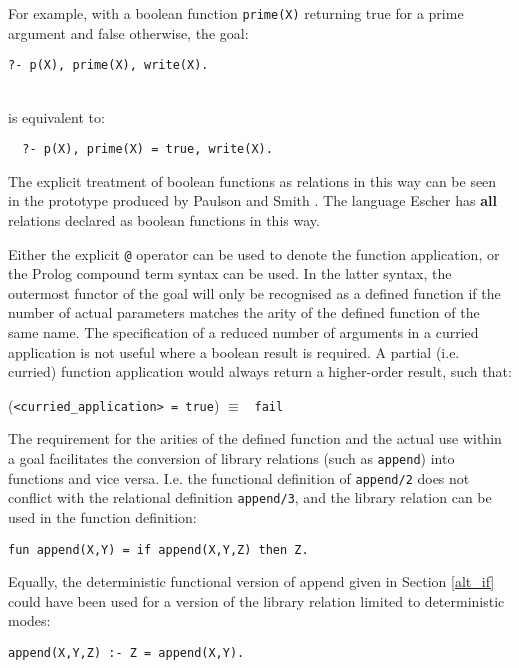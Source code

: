 \documentclass[a4paper,11pt,twoside]{article}
\begin{document}
For example, with a boolean function \texttt{prime(X)} returning true for
a prime argument and false otherwise, the goal:\\
\centerline{\texttt{?- p(X), prime(X), write(X).~~}}\\
is equivalent to:\\
\centerline{\texttt{~~?- p(X), prime(X) = true, write(X).}}

The explicit treatment of boolean functions as relations
in this way can be seen in the prototype
produced by Paulson and Smith \cite{PS91}.
The language Escher \cite{Llo94}
has \textbf{all} relations declared as boolean functions in this way.

Either the explicit \texttt{@} operator can be used to
denote the function application, or the Prolog compound term syntax can
be used.  In the latter syntax, the outermost functor of the goal will
only be recognised as a defined function if the number of actual parameters
matches the arity of the defined function of the same name.  The specification
of a reduced number of arguments in a curried application is not useful where
a boolean result is required.  A partial (i.e. curried) function application
would always return a higher-order result, such that:\\
\centerline{(\texttt{<curried\_{}application> = true}) $\equiv$ \texttt{~fail}}

The requirement for the arities of the defined function and the actual use within
a goal
facilitates the conversion of library relations (such as \texttt{append}) into
functions and vice versa.  I.e. the functional definition of \texttt{append/2}
does not conflict with the relational definition \texttt{append/3}, and the
library relation can be used in the function definition:
\begin{verbatim}
fun append(X,Y) = if append(X,Y,Z) then Z.
\end{verbatim}
Equally, the deterministic functional version of append
given in Section \ref{alt_if} could have been used for a
version of the library relation limited to deterministic modes:
\begin{verbatim}
append(X,Y,Z) :- Z = append(X,Y).
\end{verbatim}
\end{document}
